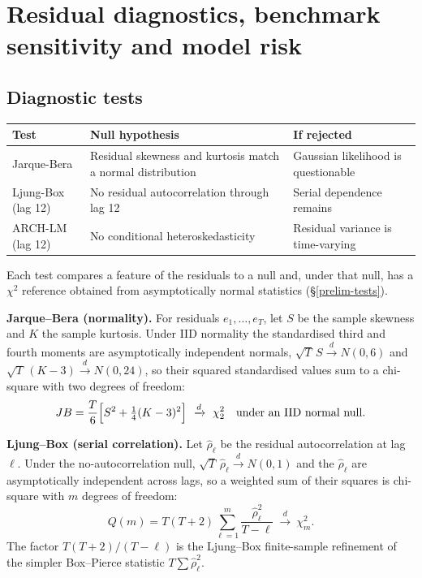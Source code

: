 \hypertarget{diagnostics}{}
\hypertarget{residual-diagnostics-benchmark-sensitivity-and-model-risk}{%
\chapter{Residual diagnostics, benchmark sensitivity and model
risk}\label{residual-diagnostics-benchmark-sensitivity-and-model-risk}}

\hypertarget{diagnostic-tests}{%
\section{Diagnostic tests}\label{diagnostic-tests}}

\begin{longtable}[]{@{}p{}p{}p{}@{}}
\toprule\noalign{}
Test & Null hypothesis & If rejected \\
\midrule\noalign{}
\endhead
\bottomrule\noalign{}
\endlastfoot
Jarque-Bera & Residual skewness and kurtosis match a normal distribution
& Gaussian likelihood is questionable \\
Ljung-Box (lag 12) & No residual autocorrelation through lag 12 & Serial
dependence remains \\
ARCH-LM (lag 12) & No conditional heteroskedasticity & Residual variance
is time-varying \\
\end{longtable}

Each test compares a feature of the residuals to a null and, under that
null, has a $\chi^2$ reference obtained from asymptotically normal
statistics (\S\ref{prelim-tests}).

\textbf{Jarque--Bera (normality).} For residuals $e_1,\dots,e_T$, let $S$ be
the sample skewness and $K$ the sample kurtosis. Under IID normality the
standardised third and fourth moments are asymptotically independent
normals, $\sqrt{T}\,S\xrightarrow{d}N(0,6)$ and
$\sqrt{T}\,(K-3)\xrightarrow{d}N(0,24)$, so their squared standardised
values sum to a chi-square with two degrees of freedom:
\begin{equation}\label{eq:ch13-jb}
JB = \frac{T}{6}\Bigl[S^2 + \tfrac14(K-3)^2\Bigr]
\ \xrightarrow{d}\ \chi^2_2 \quad\text{under an IID normal null}.
\end{equation}

\textbf{Ljung--Box (serial correlation).} Let $\hat\rho_\ell$ be the
residual autocorrelation at lag $\ell$. Under the no-autocorrelation null,
$\sqrt{T}\,\hat\rho_\ell\xrightarrow{d}N(0,1)$ and the $\hat\rho_\ell$ are
asymptotically independent across lags, so a weighted sum of their squares
is chi-square with $m$ degrees of freedom:
\begin{equation}\label{eq:ch13-lb}
Q(m) = T(T+2)\sum_{\ell=1}^{m}\frac{\hat\rho_\ell^{2}}{T-\ell}
\ \xrightarrow{d}\ \chi^2_m .
\end{equation}
The factor $T(T+2)/(T-\ell)$ is the Ljung--Box finite-sample refinement of
the simpler Box--Pierce statistic $T\sum\hat\rho_\ell^2$.

